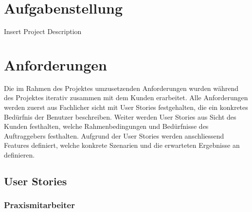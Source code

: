 \section{Aufgabenstellung}\label{sec:projectdescription}

Insert Project Description

\section{Anforderungen}\label{sec:anforderungen}

Die im Rahmen des Projektes umzusetzenden Anforderungen wurden während des Projektes iterativ zusammen mit dem Kunden erarbeitet.
Alle Anforderungen werden zuerst aus Fachlicher sicht mit User Stories festgehalten, die ein konkretes Bedürfnis der Benutzer beschreiben.
Weiter werden User Stories aus Sicht des Kunden festhalten, welche Rahmenbedingungen und Bedürfnisse des Auftraggebers festhalten.
Aufgrund der User Stories werden anschliessend Features definiert, welche konkrete Szenarien und die erwarteten Ergebnisse an definieren.

\subsection{User Stories}\label{subsec:user-stories}

\subsubsection*{Praxismitarbeiter}


